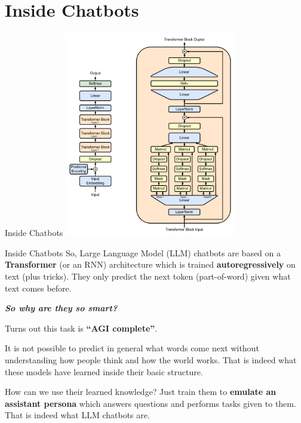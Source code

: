 \documentclass{beamer}
\begin{document}
\section{Inside Chatbots}
\begin{frame}{Inside Chatbots}
\center
\includegraphics[height=9cm]{Full_GPT_architecture.png}
\end{frame}

\begin{frame}{Inside Chatbots}
So, Large Language Model (LLM) chatbots are based on a \textbf{Transformer} (or an RNN) architecture which is trained \textbf{autoregressively} on text (plus tricks). They only predict the next token (part-of-word) given what text comes before.

\vspace{0.5cm}

\textbf{\textit{So why are they so smart?}}

Turns out this task is \textbf{``AGI complete''}.

It is not possible to predict in general what words come next without understanding how people think and how the world works. That is indeed what these models have learned inside their basic structure.

How can we use their learned knowledge? Just train them to \textbf{emulate an assistant persona} which answers questions and performs tasks given to them. That is indeed what LLM chatbots are.
\end{frame}
\end{document}
